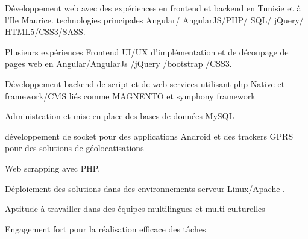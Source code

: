 \begin{cventries}
  \cventry
    {}
    {}
    {}
    {}
    {
      \begin{cvitems}
        \item {Développement  web avec des expériences en frontend et backend en Tunisie et à l'Ile Maurice. technologies principales  Angular/ AngularJS/PHP/ SQL/ jQuery/ HTML5/CSS3/SASS.}
        \item {Plusieurs expériences Frontend UI/UX d'implémentation et de découpage de pages web en  Angular/AngularJs /jQuery /bootstrap /CSS3.}        
        \item {Développement backend de script et de web services  utilisant php Native et framework/CMS liés comme MAGNENTO et symphony framework}
        \item {Administration et mise en place des bases de données MySQL}
        \item {développement de socket pour des applications Android et des trackers GPRS pour des solutions de géolocatisations} \item {Web scrapping avec PHP.}   
        \item {Déploiement des solutions dans des environnements serveur Linux/Apache .} 
        \item {Aptitude à travailler dans des équipes multilingues et multi-culturelles} 
        \item {Engagement fort pour la réalisation efficace des tâches}         
      \end{cvitems}
    }
\end{cventries}